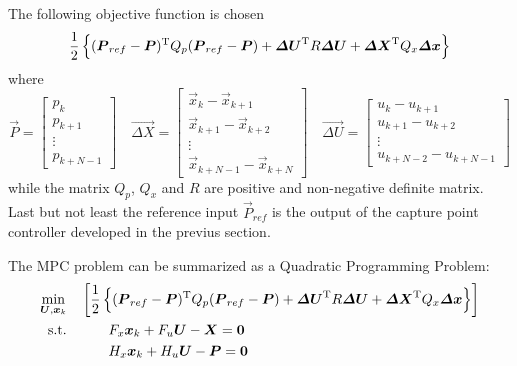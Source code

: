 The following objective function is chosen
\[
\frac{1}{2} \left\{ (\boldsymbol{P}_{ref} - \boldsymbol{P})^{\mathrm{T}} Q_p (\boldsymbol{P}_{ref} - \boldsymbol{P}) +
\boldsymbol{\Delta U} ^{\mathrm{T}} R \boldsymbol{\Delta U} + 
\boldsymbol{\Delta X} ^{\mathrm{T}} Q_x \boldsymbol{\Delta x} \right\}
\]
where
\[
\vec{P} =
\begin{bmatrix}
  p_k \\
  p_{k + 1} \\
  \vdots \\
  p_{k + N -1}
\end{bmatrix} \quad
\vec{\Delta X} =
\begin{bmatrix}
  \vec{x}_k - \vec{x}_{k+1} \\
  \vec{x}_{k + 1} - \vec{x}_{k + 2} \\
  \vdots \\
  \vec{x}_{k + N - 1} - \vec{x}_{k + N}
\end{bmatrix} \quad
\vec{\Delta U} =
\begin{bmatrix}
  u_k - u_{k+1} \\
  u_{k + 1} - u_{k + 2} \\
  \vdots \\
  u_{k + N - 2} - u_{k + N - 1}
\end{bmatrix}
\]
while the matrix $Q_p$, $Q_x$ and $R$ are positive and non-negative definite matrix.
Last but not least the reference input $\vec{P}_{ref}$ is the output of the capture point controller
developed in the previus section.
\par
The MPC problem can be summarized as a Quadratic Programming Problem:
\[
\begin{split}
  \min_{\boldsymbol{U}, \boldsymbol{x}_k} &  \quad \left[\frac{1}{2} \left\{ (\boldsymbol{P}_{ref} - \boldsymbol{P})^{\mathrm{T}} Q_p (\boldsymbol{P}_{ref} - \boldsymbol{P}) +
\boldsymbol{\Delta U} ^{\mathrm{T}} R \boldsymbol{\Delta U} + 
\boldsymbol{\Delta X} ^{\mathrm{T}} Q_x \boldsymbol{\Delta x} \right\} \right ]\\
  \text{s.t.} & \quad \quad \quad  F_{x} \boldsymbol{x}_k + F_{u} \boldsymbol{U} - \boldsymbol{X} = \boldsymbol{0}\\
  & \quad \quad \quad  H_{x} \boldsymbol{x}_k + H_{u} \boldsymbol{U} - \boldsymbol{P} = \boldsymbol{0}
\end{split}
\]
\newpage

